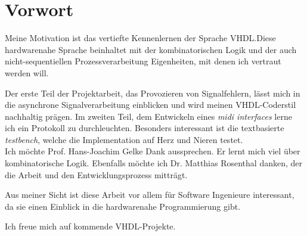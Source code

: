 
\chapter*{Vorwort}\label{chap.vorwort}

Meine Motivation ist das vertiefte Kennenlernen der Sprache VHDL.Diese hardwarenahe Sprache beinhaltet mit der kombinatorischen Logik und der auch nicht-sequentiellen Prozessverarbeitung Eigenheiten, mit denen ich vertraut werden will. 

Der erste Teil der Projektarbeit, das Provozieren von Signalfehlern, lässt mich in die asynchrone Signalverarbeitung einblicken und wird meinen VHDL-Coderstil nachhaltig prägen. Im zweiten Teil, dem Entwickeln eines \textit{midi interfaces} lerne ich ein Protokoll zu durchleuchten. Besonders interessant ist die textbasierte \textit{testbench}, welche die Implementation auf Herz und Nieren testet.\\


Ich möchte Prof. Hans-Joachim Gelke Dank aussprechen. Er lernt mich viel über kombinatorische Logik. Ebenfalls möchte ich Dr. Matthias Rosenthal danken, der die Arbeit und den Entwicklungsprozess mitträgt.

Aus meiner Sicht ist diese Arbeit vor allem für Software Ingenieure interessant, da sie einen  Einblick in die hardwarenahe Programmierung gibt.

Ich freue mich auf kommende VHDL-Projekte.

